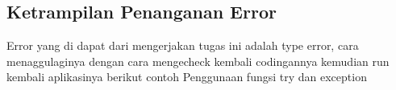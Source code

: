 \subsection{Ketrampilan Penanganan Error}
Error yang di dapat dari mengerjakan tugas ini adalah type error, cara menaggulaginya dengan cara mengecheck kembali codingannya
kemudian run kembali aplikasinya
berikut contoh Penggunaan fungsi try dan exception
